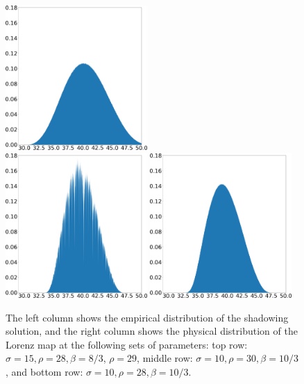 \documentclass[preprint,12pt]{elsarticle}
\begin{document}
\begin{figure}
    \hspace{0.005\textwidth}
    \includegraphics[width=0.48\textwidth]{baseline_density_lorenz_zmax_10_30_2.67.json.png}
    \\
    \includegraphics[width=0.48\textwidth]{lorenz_shadow_density_lorenz_zmax_10_28_3.33.json.png}
    \hspace{0.005\textwidth}
    \includegraphics[width=0.48\textwidth]{baseline_density_lorenz_zmax_10_28_3.33.json.png}
    \caption{The left column shows the empirical distribution of the shadowing solution, and the right column shows the physical distribution of the Lorenz map at the following sets of parameters: top row: $\sigma = 15, \rho = 28, \beta = 8/3$, $\rho = 29$, middle row: $\sigma = 10, \rho = 30, \beta = 10/3$, and bottom row: $\sigma = 10, \rho = 28, \beta = 10/3$.
    }
    \label{fig:lorenz_params_scaled}
\end{figure}
\end{document}
